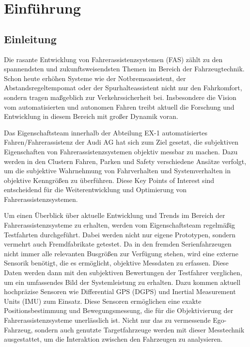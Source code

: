 \chapter{Einführung}
\label{einfuehrung}

\section{Einleitung}
Die rasante Entwicklung von Fahrerassistenzsystemen (FAS) zählt zu den spannendsten und zukunftsweisendsten Themen im Bereich der Fahrzeugtechnik. Schon heute erhöhen Systeme wie der Notbremsassistent, der Abstandsregeltempomat oder der Spurhalteassistent nicht nur den Fahrkomfort, sondern tragen maßgeblich zur Verkehrssicherheit bei. Insbesondere die Vision vom automatisierten und autonomen Fahren treibt aktuell die Forschung und Entwicklung in diesem Bereich mit großer Dynamik voran.

Das Eigenschaftsteam innerhalb der Abteilung EX-1 automatisiertes Fahren/Fahrerassistenz der Audi AG hat sich zum Ziel gesetzt, die subjektiven Eigenschaften von Fahrerassistenzsystemen objektiv messbar zu machen. Dazu werden in den Clustern Fahren, Parken und Safety verschiedene Ansätze verfolgt, um die subjektive Wahrnehmung von Fahrverhalten und Systemverhalten in objektive Kenngrößen zu überführen. Diese Key Points of Interest sind entscheidend für die Weiterentwicklung und Optimierung von Fahrerassistenzsystemen.

Um einen Überblick über aktuelle Entwicklung und Trends im Bereich der Fahrerassistenzsysteme zu erhalten, werden vom Eigenschaftsteam regelmäßig Testfahrten durchgeführt. Dabei werden nicht nur eigene Prototypen, sondern vermehrt auch Fremdfabrikate getestet. Da in den fremden Serienfahrzeugen nicht immer alle relevanten Busgrößen zur Verfügung stehen, wird eine externe Sensorik benötigt, die es ermöglicht, objektive Messdaten zu erfassen. Diese Daten werden dann mit den subjektiven Bewertungen der Testfahrer verglichen, um ein umfassendes Bild der Systemleistung zu erhalten.
Dazu kommen aktuell hochpräzise Sensoren wie Differential GPS (DGPS) und Inertial Measurement Units (IMU) zum Einsatz. Diese Sensoren ermöglichen eine exakte Positionsbestimmung und Bewegungsmessung, die für die Objektivierung der Fahrerassistenzsysteme unerlässlich ist. Nicht nur das zu vermessende Ego-Fahrzeug, sondern auch genutzte Targetfahrzeuge werden mit dieser Messtechnik ausgestattet, um die Interaktion zwischen den Fahrzeugen zu analysieren.


